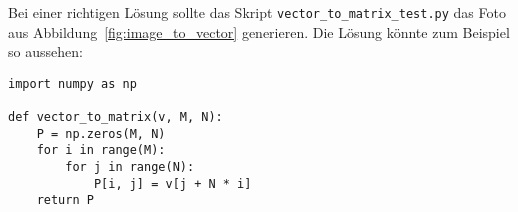 \begin{losung*}
	Bei einer richtigen Lösung sollte das Skript \texttt{vector\_to\_matrix\_test.py} das Foto aus Abbildung~\ref{fig:image_to_vector} generieren.
	Die Lösung könnte zum Beispiel so aussehen:
\begin{lstlisting}[style=python]
import numpy as np

def vector_to_matrix(v, M, N):
	P = np.zeros(M, N)
	for i in range(M):
		for j in range(N):
			P[i, j] = v[j + N * i]
	return P
\end{lstlisting}
\end{losung*}